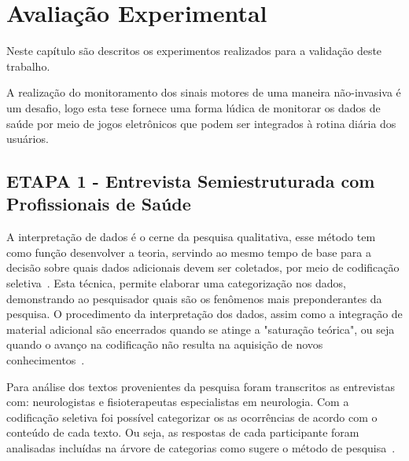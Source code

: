 \chapter{Avalia\c{c}\~{a}o Experimental} \label{chap:avaliacao}
Neste capítulo são descritos os experimentos realizados para a validação deste trabalho.

A realização do monitoramento dos sinais motores de uma maneira não-invasiva é um desafio, logo esta tese fornece uma forma lúdica de monitorar os dados de saúde por meio de jogos eletrônicos que podem ser integrados à rotina diária dos usuários. %





\section{ETAPA 1 - Entrevista Semiestruturada com Profissionais de Saúde}\label{chapter:entrevista_semi_estruturada}

A interpretação de dados é o cerne da pesquisa qualitativa, esse método tem como função desenvolver a teoria, servindo ao mesmo tempo de base para a decisão sobre quais dados adicionais devem ser coletados, por meio de codificação seletiva~\cite{FLI04}. Esta técnica, permite elaborar uma categorização nos dados, demonstrando ao pesquisador quais são os fenômenos mais preponderantes da pesquisa. O procedimento da interpretação dos dados, assim como a integração de material adicional são encerrados quando se atinge a "saturação teórica", ou seja quando o avanço na codificação não resulta na aquisição de novos conhecimentos~\cite{FLI04}.

Para análise dos textos provenientes da pesquisa foram transcritos as entrevistas com: neurologistas e fisioterapeutas especialistas em neurologia. Com  a codificação seletiva foi possível categorizar os as ocorrências de acordo com o conteúdo de cada texto. Ou seja, as respostas de cada participante foram analisadas incluídas na árvore de categorias como sugere o método de pesquisa~\cite{FLI04}. 

